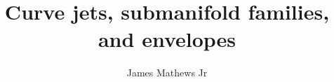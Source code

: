 \documentclass[12pt]{article}
\numberwithin{equation}{section}
\newcounter{count}
\theoremstyle{plain}
\theoremstyle{definition}
\begin{document}
\title{Curve jets, submanifold families, and envelopes}
\author{James Mathews Jr}
\maketitle




{}
\setcounter{page}{1}

\end{document}
